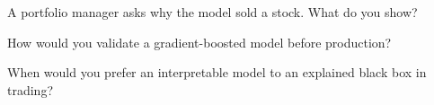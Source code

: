 \begin{interviewq}\label{iq:ml:interpretability-and-model-governance:4}
A portfolio manager asks why the model sold a stock. What do you show?
\end{interviewq}

\begin{interviewq}\label{iq:ml:interpretability-and-model-governance:5}
How would you validate a gradient-boosted model before production?
\end{interviewq}

\begin{interviewq}\label{iq:ml:interpretability-and-model-governance:6}
When would you prefer an interpretable model to an explained black box in trading?
\end{interviewq}
